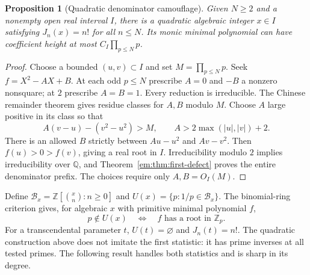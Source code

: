 \documentclass[11pt,a4paper]{article}
\newtheorem{proposition}[theorem]{Proposition}
\theoremstyle{definition}
\theoremstyle{remark}
\theoremstyle{plain}
\numberwithin{equation}{section}
\begin{document}
\begin{proposition}[Quadratic denominator camouflage]\label{em:prop:quadratic-J}
Given $N\ge2$ and a nonempty open real interval $I$, there is a
quadratic algebraic integer $x\in I$ satisfying $J_n(x)=n!$ for all
$n\le N$.  Its monic minimal polynomial can have coefficient height
at most $C_I\prod_{p\le N}p$.
\end{proposition}
\begin{proof}
Choose a bounded $(u,v)\subset I$ and set $M=\prod_{p\le N}p$.
Seek $f=X^2-AX+B$.  At each odd $p\le N$ prescribe $A=0$ and
$-B$ a nonzero nonsquare; at $2$ prescribe $A=B=1$.  Every reduction
is irreducible.  The Chinese remainder theorem gives residue classes
for $A,B$ modulo $M$.  Choose $A$ large positive in its class so that
\[
 A(v-u)-(v^2-u^2)>M,\qquad A>2\max(|u|,|v|)+2.
\]
There is an allowed $B$ strictly between $Au-u^2$ and $Av-v^2$.
Then $f(u)>0>f(v)$, giving a real root in $I$.  Irreducibility modulo
$2$ implies irreducibility over $\mathbb Q$, and
Theorem~\ref{em:thm:first-defect} proves the entire denominator prefix.
The choices require only $A,B=O_I(M)$.
\end{proof}

Define $\mathcal B_x=\mathbb Z[\binom xn:n\ge0]$ and
$U(x)=\{p:1/p\in\mathcal B_x\}$.  The binomial-ring criterion gives,
for algebraic $x$ with primitive minimal polynomial $f$,
\begin{equation}\label{em:eq:local-unit-criterion}
p\notin U(x)\quad\Longleftrightarrow\quad
f\text{ has a root in }\mathbb Z_p.
\end{equation}
For a transcendental parameter $t$, $U(t)=\varnothing$ and $J_n(t)=n!$.
The quadratic construction above does not imitate the first statistic:
it has prime inverses at all tested primes.  The following result
handles both statistics and is sharp in its degree.
\end{document}
